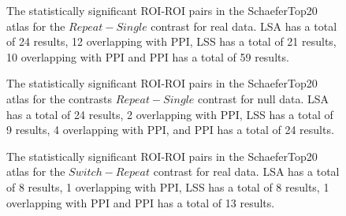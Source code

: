 \documentclass[phd,appendix,figures]{uithesis}
\begin{document}
\begin{figure}[H]
  \ContinuedFloat
  \centering


  \caption{
      The statistically significant ROI-ROI pairs in the SchaeferTop20 atlas
      for the $Repeat - Single$ contrast for real data.
      LSA has a total of 24 results, 12 overlapping with PPI,
      LSS has a total of 21 results, 10 overlapping with PPI and
      PPI has a total of 59 results.
  }
  \label{fig:data-real_type-brain_atlas-schaeferbest_contrast-repeatxsingle}
\end{figure}

\begin{figure}[H]
  \ContinuedFloat
  \centering


  \caption{
      The statistically significant ROI-ROI pairs in the SchaeferTop20 atlas
      for the contrasts $Repeat - Single$ contrast for null data.
      LSA has a total of 24 results, 2 overlapping with PPI,
      LSS has a total of 9 results, 4 overlapping with PPI,
      and PPI has a total of 24 results.
  }
  \label{fig:data-null_type-brain_atlas-schaeferbest_contrast-repeatxsingle}
\end{figure}

\begin{figure}[H]
  \ContinuedFloat
  \centering


  \caption{
      The statistically significant ROI-ROI pairs in the SchaeferTop20 atlas
      for the $Switch - Repeat$ contrast for real data.
      LSA has a total of 8 results, 1 overlapping with PPI,
      LSS has a total of 8 results, 1 overlapping with PPI and
      PPI has a total of 13 results.
  }
  \label{fig:data-real_type-brain_atlas-schaeferbest_contrast-switchxrepeat}
\end{figure}
\end{document}
